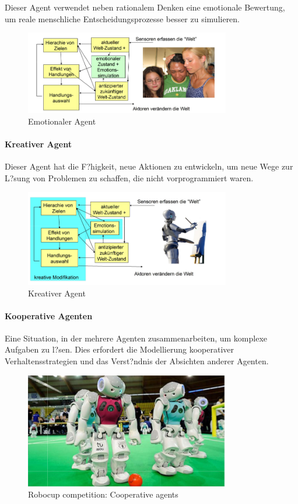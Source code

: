 Dieser Agent verwendet neben rationalem Denken eine emotionale Bewertung, um reale menschliche Entscheidungsprozesse besser zu simulieren.

\begin{figure}[H]
    \centering
    \includegraphics[width=0.8\textwidth]{figures/emotionaler-agent.png}
    \caption{Emotionaler Agent}
    \label{fig:emo-agent}
\end{figure}

\paragraph{Kreativer Agent}

Dieser Agent hat die F?higkeit, neue Aktionen zu entwickeln, um neue Wege zur L?sung von Problemen zu schaffen, die nicht vorprogrammiert waren.

\begin{figure}[H]
    \centering
    \includegraphics[width=0.8\textwidth]{figures/creative-agent.png}
    \caption{Kreativer Agent}
    \label{fig:creative-agent}
\end{figure}


\paragraph{Kooperative Agenten}

Eine Situation, in der mehrere Agenten zusammenarbeiten, um komplexe Aufgaben zu l?sen. Dies erfordert die Modellierung kooperativer Verhaltensstrategien und das Verst?ndnis der Absichten anderer Agenten.

\begin{figure}[H]
    \centering
    \includegraphics[width=0.8\textwidth]{figures/robocup.png}
    \caption{Robocup competition: Cooperative agents}
    \label{fig:coop-agent}
\end{figure}